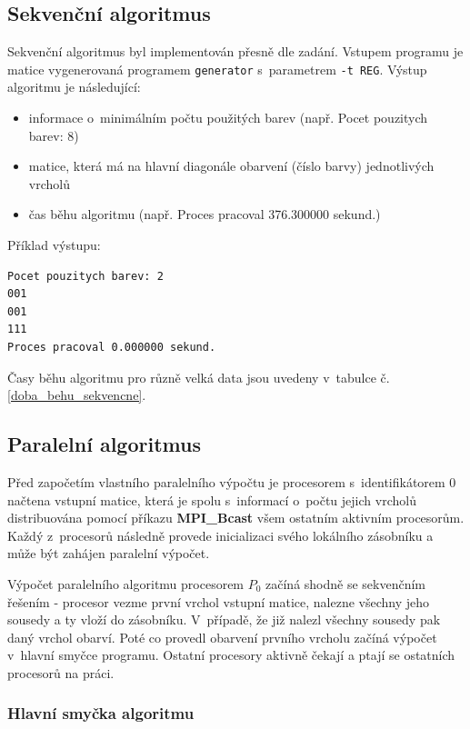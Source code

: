 \documentclass[12pt]{article}
\begin{document}
\subsection{Sekvenční algoritmus}
Sekvenční algoritmus byl implementován přesně dle zadání. Vstupem programu je matice vygenerovaná programem \texttt{generator} s~parametrem \texttt{-t REG}. Výstup algoritmu je následující:
\begin{itemize}
\item informace o~minimálním počtu použitých barev (např. Pocet pouzitych barev: 8)
\item matice, která má na hlavní diagonále obarvení (číslo barvy) jednotlivých vrcholů
\item čas běhu algoritmu (např. Proces pracoval 376.300000 sekund.)
\end{itemize}

Příklad výstupu:
\begin{verbatim}
Pocet pouzitych barev: 2
001
001
111
Proces pracoval 0.000000 sekund.
\end{verbatim}

Časy běhu algoritmu pro různě velká data jsou uvedeny v~tabulce č. \ref{doba_behu_sekvencne}.

\subsection{Paralelní algoritmus}

Před započetím vlastního paralelního výpočtu je procesorem s~identifikátorem 0 načtena vstupní matice, která je spolu s~informací o~počtu jejich vrcholů distribuována pomocí příkazu \textbf{MPI\_Bcast} všem ostatním aktivním procesorům. Každý z~procesorů následně provede inicializaci svého lokálního zásobníku a může být zahájen paralelní výpočet.

Výpočet paralelního algoritmu procesorem $P_0$ začíná shodně se sekvenčním řešením - procesor vezme první vrchol vstupní matice, nalezne všechny jeho sousedy a ty vloží do zásobníku. V~případě, že již nalezl všechny sousedy pak daný vrchol obarví. Poté co provedl obarvení prvního vrcholu začíná výpočet v~hlavní smyčce programu. Ostatní procesory aktivně čekají a ptají se ostatních procesorů na práci.

\subsubsection{Hlavní smyčka algoritmu}
\end{document}
